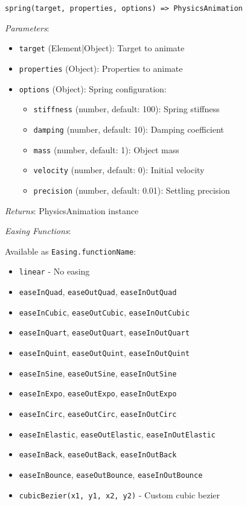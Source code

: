\documentclass[11pt]{article}
\begin{document}
\begin{verbatim}
spring(target, properties, options) => PhysicsAnimation
\end{verbatim}

\emph{Parameters}:
\begin{itemize}
\item \texttt{target} (Element|Object): Target to animate
\item \texttt{properties} (Object): Properties to animate
\item \texttt{options} (Object): Spring configuration:
\begin{itemize}
\item \texttt{stiffness} (number, default: 100): Spring stiffness
\item \texttt{damping} (number, default: 10): Damping coefficient
\item \texttt{mass} (number, default: 1): Object mass
\item \texttt{velocity} (number, default: 0): Initial velocity
\item \texttt{precision} (number, default: 0.01): Settling precision
\end{itemize}
\end{itemize}

\emph{Returns}: PhysicsAnimation instance

\emph{Easing Functions}:

Available as \texttt{Easing.functionName}:

\begin{itemize}
\item \texttt{linear} - No easing
\item \texttt{easeInQuad}, \texttt{easeOutQuad}, \texttt{easeInOutQuad}
\item \texttt{easeInCubic}, \texttt{easeOutCubic}, \texttt{easeInOutCubic}
\item \texttt{easeInQuart}, \texttt{easeOutQuart}, \texttt{easeInOutQuart}
\item \texttt{easeInQuint}, \texttt{easeOutQuint}, \texttt{easeInOutQuint}
\item \texttt{easeInSine}, \texttt{easeOutSine}, \texttt{easeInOutSine}
\item \texttt{easeInExpo}, \texttt{easeOutExpo}, \texttt{easeInOutExpo}
\item \texttt{easeInCirc}, \texttt{easeOutCirc}, \texttt{easeInOutCirc}
\item \texttt{easeInElastic}, \texttt{easeOutElastic}, \texttt{easeInOutElastic}
\item \texttt{easeInBack}, \texttt{easeOutBack}, \texttt{easeInOutBack}
\item \texttt{easeInBounce}, \texttt{easeOutBounce}, \texttt{easeInOutBounce}
\item \texttt{cubicBezier(x1, y1, x2, y2)} - Custom cubic bezier
\end{itemize}
\end{document}
